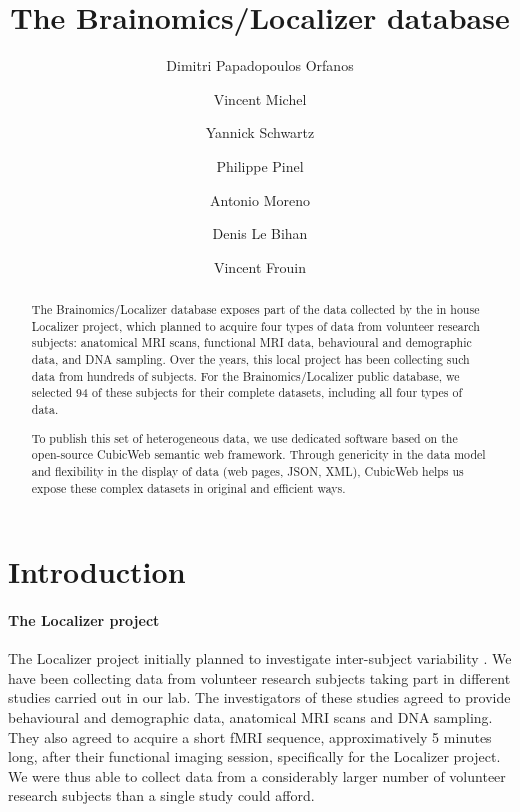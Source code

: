 \documentclass[preprint,review,12pt]{elsarticle}
\begin{document}
\begin{frontmatter}

\title{The Brainomics/Localizer database}

\author[Neurospin]{Dimitri Papadopoulos Orfanos}
\author[Logilab]{Vincent Michel}
\author[Parietal,Neurospin]{Yannick Schwartz}
\author[U992,Neurospin,ParisSud]{Philippe Pinel}
\author[U992,Neurospin,ParisSud]{Antonio Moreno}
\author[Neurospin]{Denis Le Bihan}
\author[Neurospin]{Vincent Frouin}

\address[Neurospin]{CEA, DSV/I2BM, NeuroSpin, 91191 Gif-sur-Yvette, France}
\address[U992]{INSERM, U992, Cognitive Neuroimaging Unit, 91191 Gif-sur-Yvette, France}
\address[Parietal]{Parietal team, Inria Saclay \^Ile-de-France, 91120 Palaiseau, France}
\address[ParisSud]{Univ. Paris-Sud, Cognitive Neuroimaging Unit, 91191 Gif-sur-Yvette, France}
\address[Logilab]{Logilab, 104 boulevard Auguste Blanqui, 75013 Paris, France}

\begin{abstract}
The Brainomics/Localizer database exposes part of the data collected by the in house Localizer project, which planned to acquire four types of data from volunteer research subjects: anatomical MRI scans, functional MRI data, behavioural and demographic data, and DNA sampling. Over the years, this local project has been collecting such data from hundreds of subjects. For the Brainomics/Localizer public database, we selected 94 of these subjects for their complete datasets, including all four types of data.

To publish this set of heterogeneous data, we use dedicated software based on the open-source CubicWeb semantic web framework. Through genericity in the data model and flexibility in the display of data (web pages, JSON, XML), CubicWeb helps us expose these complex datasets in original and efficient ways.
\end{abstract}

\end{frontmatter}


\section{Introduction}

\paragraph{The Localizer project} The Localizer project initially planned to investigate inter-subject variability \cite{Pinel2007}. We have been collecting data from volunteer research subjects taking part in different studies carried out in our lab. The investigators of these studies agreed to provide behavioural and demographic data, anatomical MRI scans and DNA sampling. They also agreed to acquire a short fMRI sequence, approximatively 5 minutes long, after their functional imaging session, specifically for the Localizer project. We were thus able to collect data from a considerably larger number of volunteer research subjects than a single study could afford.
\end{document}
